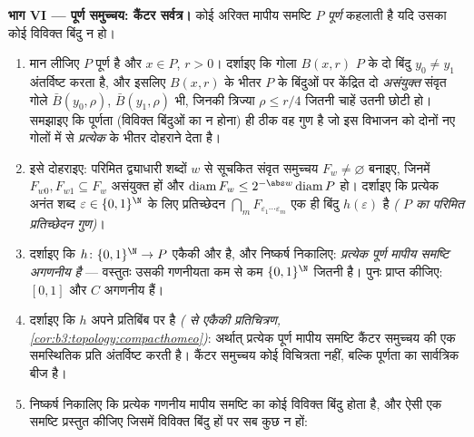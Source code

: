\begin{problem}
\medskip
\noindent\textbf{भाग VI --- पूर्ण  समुच्चय: कैंटर सर्वत्र।}
कोई अरिक्त  मापीय समष्टि $P$ \emph{पूर्ण} कहलाती है यदि
उसका कोई विविक्त बिंदु न हो।
\begin{enumerate}[resume]
  \item मान लीजिए $P$ पूर्ण  है और $x \in P$, $r > 0$। दर्शाइए
        कि गोला $B(x, r)$ $P$ के दो बिंदु $y_0
        \neq y_1$ अंतर्विष्ट करता है,
        और इसलिए $B(x, r)$ के भीतर $P$ के बिंदुओं पर केंद्रित दो
        \emph{असंयुक्त} संवृत गोले $\bar B(y_0, \rho)$, $\bar B(y_1, \rho)$ भी, जिनकी
        त्रिज्या $\rho
        \leq r/4$ जितनी चाहें उतनी छोटी हो। समझाइए कि
        पूर्णता (विविक्त बिंदुओं का न होना) ही ठीक वह गुण है जो
        इस विभाजन को दोनों नए गोलों में से \emph{प्रत्येक} के
        भीतर दोहराने देता है।
  \item इसे दोहराइए: परिमित द्व्याधारी शब्दों $w$ से सूचकित
        संवृत समुच्चय $F_w \neq \varnothing$ बनाइए, जिनमें $F_{w0},
        F_{w1} \subseteq F_w$ असंयुक्त हों और
        $\operatorname{diam}F_w \leq 2^{-\abs w}
        \operatorname{diam}P$ हो। दर्शाइए कि प्रत्येक अनंत शब्द $\varepsilon \in \{0,1\}^\N$ के लिए
        प्रतिच्छेदन $\bigcap_mF_{\varepsilon_1\cdots\varepsilon_m}$ एक ही बिंदु $h(\varepsilon)$ है \emph{( $P$
        का परिमित प्रतिच्छेदन गुण)}।
  \item दर्शाइए कि $h\colon\{0,1\}^\N \to P$ एकैकी और  है, और निष्कर्ष निकालिए:
        \emph{प्रत्येक पूर्ण  मापीय समष्टि अगणनीय है} ---
        वस्तुतः उसकी गणनीयता कम से कम $\{0,1\}^\N$ जितनी है। पुनः
        प्राप्त कीजिए: $[0,1]$ और $C$ अगणनीय हैं।
  \item दर्शाइए कि $h$ अपने प्रतिबिंब पर  है
        \emph{( से  एकैकी प्रतिचित्रण, \cref{cor:b3:topology:compacthomeo})}: अर्थात्
        प्रत्येक पूर्ण  मापीय समष्टि कैंटर समुच्चय की एक
        समस्थितिक प्रति अंतर्विष्ट करती है। कैंटर समुच्चय कोई
        विचित्रता नहीं, बल्कि  पूर्णता का सार्वत्रिक बीज है।
  \item निष्कर्ष निकालिए कि प्रत्येक गणनीय  मापीय समष्टि का
        कोई विविक्त बिंदु होता है, और ऐसी एक समष्टि प्रस्तुत
        कीजिए जिसमें विविक्त बिंदु  हों पर सब कुछ न हों:

\end{enumerate}
\end{problem}
